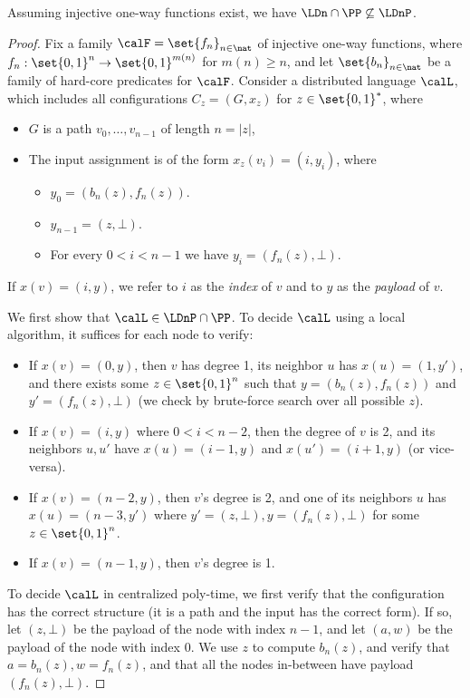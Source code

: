 \begin{theorem}
	Assuming injective one-way functions exist,
	we have $\LDn \cap \PP \not \subseteq \LDnP$.
	\label{thm:sep_enc}
\end{theorem}
\begin{proof}
	Fix a family $\calF = \set{ f_n }_{n \in \nat}$ of injective one-way functions,
	where $f_n : \set{0,1}^n \rightarrow \set{0,1}^{m(n)}$ for $m(n) \geq n$,
	and let $\set{ b_n }_{n \in \nat}$ be a family of hard-core predicates for $\calF$.
	Consider a distributed language $\calL$, which includes all configurations $C_z = (G, x_z)$ for $z \in \set{0,1}^{\ast}$,
	where
	\begin{itemize}
		\item $G$ is a path $v_0,\ldots,v_{n-1}$ of length $n = |z|$,
		\item The input assignment is of the form $x_z(v_i) = (i, y_i)$, where 
			\begin{itemize}
				\item $y_0 = (b_n(z), f_n(z))$.
				\item $y_{n-1} = (z, \bot)$.
				\item For every $0 < i < n - 1$ we have $y_i = (f_n(z), \bot)$.
			\end{itemize}
	\end{itemize}
	If $x(v) = (i, y)$, we refer to $i$ as the \emph{index} of $v$ and to $y$ as the \emph{payload} of $v$.

	We first show that $\calL \in \LDnP \cap \PP$.
	To decide $\calL$ using a local algorithm, it suffices for each node to verify:
	\begin{itemize}
		\item If $x(v) = (0, y)$, then $v$ has degree 1,
			its neighbor $u$ has $x(u) = (1, y')$,
			and there exists some $z \in \set{0,1}^n$ such that
			$y = (b_n(z), f_n(z))$ and $y' = (f_n(z), \bot)$
			(we check by brute-force search over all possible $z$).
		\item If $x(v) = (i, y)$ where $0 < i < n - 2$,
			then the degree of $v$ is 2,
			and its neighbors $u, u'$ have $x(u) = (i - 1, y)$ and $x(u') = (i+1, y)$
			(or vice-versa).
		\item If $x(v) = (n - 2, y)$, then $v$'s degree is 2, and one of its neighbors $u$
			has $x(u) = (n-3, y')$
			where $y' = (z, \bot), y = (f_n(z), \bot)$ for some $z \in \set{0,1}^n$.
		\item If $x(v) = (n-1, y)$, then $v$'s degree is 1.
	\end{itemize}
	To decide $\calL$ in centralized poly-time,
	we first verify that the configuration has the correct structure (it is a path and the input has the correct form).
	If so, let $(z, \bot)$ be the payload of the node with index $n - 1$, 
	and let $(a, w)$ be the payload of the node with index 0.
	We use $z$ to compute $b_n(z)$,
	and verify that $a = b_n(z), w = f_n(z)$, and that all the nodes in-between have payload $(f_n(z), \bot)$.


\end{proof}
